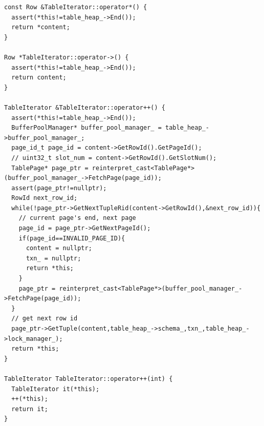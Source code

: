 \documentclass{article}
\begin{document}
\begin{appendices}
\begin{lstlisting}
const Row &TableIterator::operator*() {
  assert(*this!=table_heap_->End());
  return *content;
}

Row *TableIterator::operator->() {
  assert(*this!=table_heap_->End());
  return content;
}

TableIterator &TableIterator::operator++() {
  assert(*this!=table_heap_->End());
  BufferPoolManager* buffer_pool_manager_ = table_heap_->buffer_pool_manager_;
  page_id_t page_id = content->GetRowId().GetPageId();
  // uint32_t slot_num = content->GetRowId().GetSlotNum();
  TablePage* page_ptr = reinterpret_cast<TablePage*>(buffer_pool_manager_->FetchPage(page_id));
  assert(page_ptr!=nullptr);
  RowId next_row_id;
  while(!page_ptr->GetNextTupleRid(content->GetRowId(),&next_row_id)){
    // current page's end, next page
    page_id = page_ptr->GetNextPageId();
    if(page_id==INVALID_PAGE_ID){
      content = nullptr;
      txn_ = nullptr;
      return *this;
    }
    page_ptr = reinterpret_cast<TablePage*>(buffer_pool_manager_->FetchPage(page_id));
  }
  // get next row id
  page_ptr->GetTuple(content,table_heap_->schema_,txn_,table_heap_->lock_manager_);
  return *this;
}

TableIterator TableIterator::operator++(int) {
  TableIterator it(*this);
  ++(*this);
  return it;
}

    \end{lstlisting}
\end{appendices}
\end{document}
